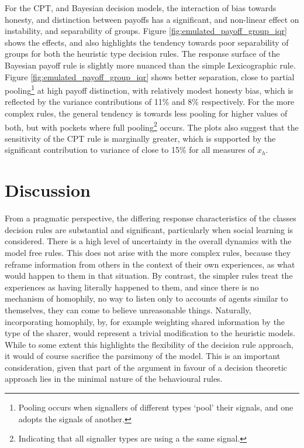 \documentclass[graybox]{svmult}
\begin{document}
For the \ac{CPT}, and Bayesian decision models, the interaction of bias towards honesty, and distinction between payoffs has a significant, and non-linear effect on instability, and separability of groups. Figure \ref{fig:emulated_payoff_group_iqr} shows the effects, and also highlights the tendency towards poor separability of groups for both the heuristic type decision rules. The response surface of the Bayesian payoff rule is slightly more nuanced than the simple Lexicographic rule. Figure \ref{fig:emulated_payoff_group_iqr} shows better separation, close to partial pooling\footnote{Pooling occurs when signallers of different types `pool' their signals, and one adopts the signals of another.} at high payoff distinction, with relatively modest honesty bias, which is reflected by the variance contributions of 11\% and 8\% respectively.  For the more complex rules, the general tendency is towards less pooling for higher values of both, but with pockets where full pooling\footnote{Indicating that all signaller types are using a the same signal.} occurs.  The plots also suggest that the sensitivity of the \ac{CPT} rule is marginally greater, which is supported by the significant contribution to variance of close to 15\% for all measures of \(x_{h}\).
 
\section{Discussion}
\label{sec:discussion}

From a pragmatic perspective, the differing response characteristics of the classes decision rules are substantial and significant, particularly when social learning is considered. There is a high level of uncertainty in the overall dynamics with the model free rules. This does not arise with the more complex rules, because they reframe information from others in the context of their own experiences, as what would happen to them in that situation. By contrast, the simpler rules treat the experiences as having literally happened to them, and since there is no mechanism of homophily, no way to listen only to accounts of agents similar to themselves, they can come to believe unreasonable things. Naturally, incorporating homophily, by, for example weighting shared information by the type of the sharer, would represent a trivial modification to the heuristic models. While to some extent this highlights the flexibility of the decision rule approach, it would of course sacrifice the parsimony of the model. This is an important consideration, given that part of the argument in favour of a decision theoretic approach lies in the minimal nature of the behavioural rules.
\end{document}
